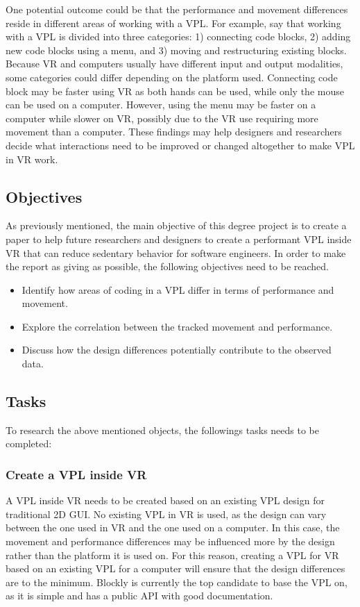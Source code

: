\documentclass{sigchi}
\begin{document}
One potential outcome could be that the performance and movement differences reside in different areas of working with a VPL. For example, say that working with a VPL is divided into three categories: 1) connecting code blocks, 2) adding new code blocks using a menu, and 3) moving and restructuring existing blocks. Because VR and computers usually have different input and output modalities, some categories could differ depending on the platform used. Connecting code block may be faster using VR as both hands can be used, while only the mouse can be used on a computer. However, using the menu may be faster on a computer while slower on VR, possibly due to the VR use requiring more movement than a computer. These findings may help designers and researchers decide what interactions need to be improved or changed altogether to make VPL in VR work. 

\subsection{Objectives}
As previously mentioned, the main objective of this degree project is to create a paper to help future researchers and designers to create a performant VPL inside VR that can reduce sedentary behavior for software engineers. In order to make the report as giving as possible, the following objectives need to be reached.

\begin{itemize}
  \item Identify how areas of coding in a VPL differ in terms of performance and movement.
  \item Explore the correlation between the tracked movement and performance.
  \item Discuss how the design differences potentially contribute to the observed data.
\end{itemize}

\subsection{Tasks}
To research the above mentioned objects, the followings tasks needs to be completed:

\subsubsection{Create a VPL inside VR}
A VPL inside VR needs to be created based on an existing VPL design for traditional 2D GUI. No existing VPL in VR is used, as the design can vary between the one used in VR and the one used on a computer. In this case, the movement and performance differences may be influenced more by the design rather than the platform it is used on. For this reason, creating a VPL for VR based on an existing VPL for a computer will ensure that the design differences are to the minimum. Blockly is currently the top candidate to base the VPL on, as it is simple and has a public API with good documentation.
\end{document}
